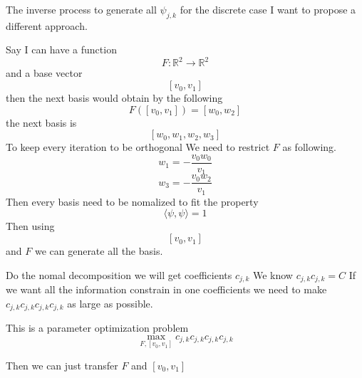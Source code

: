 \documentclass{article}
\theoremstyle{definition} %
\begin{document}
The inverse process to generate all \(\psi_{j,k}\)
for the discrete case I want to propose a different
approach.

Say I can have a function
\[
    F:\mathbb{R}^2\to\mathbb{R}^2
\]
and a base vector
\[
    [v_0,v_1]
\]
then the next basis would obtain by
the following
\[
    F([v_0,v_1])=[w_0,w_2]
\]
the next basis is
\[
    [w_0,w_1,w_2,w_3]
\]
To keep every iteration to be orthogonal
We need to restrict \(F\)
as following.
\[
    w_1=-\frac{v_0w_0}{v_1}
\]
\[
    w_3=-\frac{v_0w_2}{v_1}
\]
Then every basis need to be nomalized
to fit the property
\[
    \langle\psi,\psi\rangle=1
\]
Then using
\[
    [v_0,v_1]
\]
and \(F\)
we can generate all the basis.

Do the nomal decomposition we will
get coefficients \(c_{j,k}\)
We know \(c_{j,k}c_{j,k}=C\)
If we want all the information
constrain in one coefficients
we need to make
\(c_{j,k}c_{j,k}c_{j,k}c_{j,k}\)
as large as possible.

This is a parameter optimization
problem
\[
    \max_{F,[v_0,v_1]}c_{j,k}c_{j,k}c_{j,k}c_{j,k}
\]

Then we can just transfer \(F\) and \([v_0,v_1]\)





\end{document}
